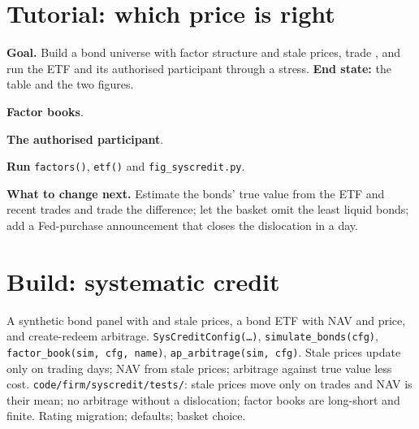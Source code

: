 \section{Tutorial: which price is right}\label{tut:s2:systematic-credit-and-bond-etf-arbitrage:tut}

\begin{tutorial}
\textbf{Goal.} Build a bond universe with factor structure and stale prices, trade , and run the ETF and its authorised participant
through a stress. \textbf{End state:} the table and the two figures.
\begin{tutsteps}
\item \textbf{Factor books}.
\label{lst:s2:systematic-credit-and-bond-etf-arbitrage:factors}
\item \textbf{The authorised participant}.
\label{lst:s2:systematic-credit-and-bond-etf-arbitrage:ap}
\item \textbf{Run} \texttt{factors()}, \texttt{etf()} and \texttt{fig\_syscredit.py}.
\end{tutsteps}
\textbf{What to change next.} Estimate the bonds' true value from the ETF and recent trades and trade the difference; let the basket omit the least
liquid bonds; add a Fed-purchase announcement that closes the dislocation in a day.
\end{tutorial}

\section{Build: systematic credit}\label{bld:s2:systematic-credit-and-bond-etf-arbitrage:syscredit}

\begin{build}
 A synthetic bond panel with  and stale prices, a bond ETF with NAV and price, and create-redeem arbitrage.
 \texttt{SysCreditConfig(\dots)}, \texttt{simulate\_bonds(cfg)}, \texttt{factor\_book(sim, cfg, name)},
\texttt{ap\_arbitrage(sim, cfg)}.
 Stale prices update only on trading days; NAV from stale prices; arbitrage against true value less cost.
 \texttt{code/firm/syscredit/tests/}: stale prices move only on trades and NAV is their mean; no arbitrage without a
dislocation; factor books are long-short and finite.
 Rating migration; defaults; basket choice.
\end{build}

